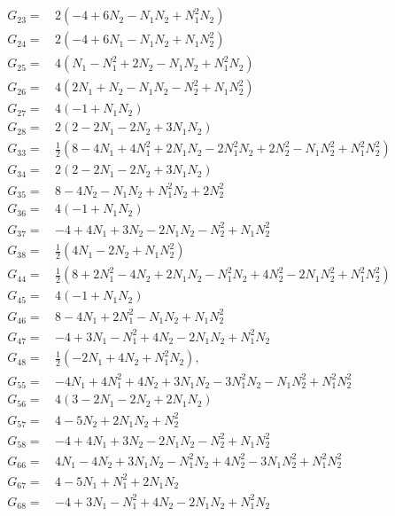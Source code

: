 \begin{subappendices}
\begin{align}
\nonumber \\
G_{23}=\,&2 (-4 + 6 N_2 - N_1 N_2 + N_1^2 N_2)
\nonumber \\
G_{24}=\,&2 (-4 + 6 N_1 - N_1 N_2 + N_1 N_2^2)
\nonumber \\
G_{25}=\,&4 (N_1 - N_1^2 + 2 N_2 - N_1 N_2 + N_1^2 N_2)
\nonumber \\
G_{26}=\,&4 (2 N_1 + N_2 - N_1 N_2 - N_2^2 + N_1 N_2^2)
\nonumber \\
G_{27}=\,&4 (-1 + N_1 N_2)
\nonumber \\
G_{28}=\,&2 (2 - 2 N_1 - 2 N_2 + 3 N_1 N_2)
\nonumber \\
G_{33}=\,&\frac{1}{2} (8 - 4 N_1 + 4 N_1^2 + 2 N_1 N_2 - 2 N_1^2 N_2 + 2 N_2^2 - N_1 N_2^2 + N_1^2 N_2^2)
\nonumber \\
G_{34}=\,&2 (2 - 2 N_1 - 2 N_2 + 3 N_1 N_2)
\nonumber \\
G_{35}=\,&8 - 4 N_2 - N_1 N_2 + N_1^2 N_2 + 2 N_2^2
\nonumber \\
G_{36}=\,&4 (-1 + N_1 N_2)
\nonumber \\
G_{37}=\,&-4 + 4 N_1 + 3 N_2 - 2 N_1 N_2 - N_2^2 + N_1 N_2^2
\nonumber \\
G_{38}=\,&\frac{1}{2} (4 N_1 - 2 N_2 + N_1 N_2^2)
\nonumber \\
G_{44}=\,&\frac{1}{2} (8 + 2 N_1^2 - 4 N_2 + 2 N_1 N_2 - N_1^2 N_2 + 4 N_2^2 - 2 N_1 N_2^2 + N_1^2 N_2^2)
\nonumber \\
G_{45}=\,&4 (-1 + N_1 N_2)
\nonumber \\
G_{46}=\,&8 - 4 N_1 + 2 N_1^2 - N_1 N_2 + N_1 N_2^2
\nonumber \\
G_{47}=\,&-4 + 3 N_1 - N_1^2 + 4 N_2 - 2 N_1 N_2 + N_1^2 N_2
\nonumber \\
G_{48}=\,&\frac{1}{2} (-2 N_1 + 4 N_2 + N_1^2 N_2),
\nonumber \\
G_{55}=\,&-4 N_1 + 4 N_1^2 + 4 N_2 + 3 N_1 N_2 - 3 N_1^2 N_2 - N_1 N_2^2 + N_1^2 N_2^2
\nonumber \\
G_{56}=\,&4 (3 - 2 N_1 - 2 N_2 + 2 N_1 N_2)
\nonumber \\
G_{57}=\,&4 - 5 N_2 + 2 N_1 N_2 + N_2^2
\nonumber \\
G_{58}=\,&-4 + 4 N_1 + 3 N_2 - 2 N_1 N_2 - N_2^2 + N_1 N_2^2
\nonumber \\
G_{66}=\,&4 N_1 - 4 N_2 + 3 N_1 N_2 - N_1^2 N_2 + 4 N_2^2 - 3 N_1 N_2^2 + N_1^2 N_2^2
\nonumber \\
G_{67}=\,&4 - 5 N_1 + N_1^2 + 2 N_1 N_2
\nonumber \\
G_{68}=\,&-4 + 3 N_1 - N_1^2 + 4 N_2 - 2 N_1 N_2 + N_1^2 N_2

\end{align}
\end{subappendices}
